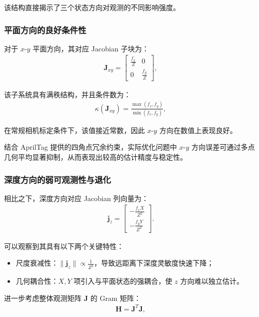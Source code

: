 该结构直接揭示了三个状态方向对观测的不同影响强度。

\subsubsection{平面方向的良好条件性}

对于 $x$-$y$ 平面方向，其对应 Jacobian 子块为：
\begin{align}
\mathbf{J}_{xy} =
\begin{bmatrix}
\frac{f_x}{Z} & 0 \\
0 & \frac{f_y}{Z}
\end{bmatrix},
\end{align}

该子系统具有满秩结构，并且条件数为：
\begin{align}
\kappa(\mathbf{J}_{xy}) = \frac{\max(f_x, f_y)}{\min(f_x, f_y)},
\end{align}

在常规相机标定条件下，该值接近常数，因此 $x$-$y$ 方向在数值上表现良好。

结合 AprilTag 提供的四角点冗余约束，实际优化问题中 $x$-$y$ 方向误差可通过多点几何平均显著抑制，从而表现出较高的估计精度与稳定性。

\subsubsection{深度方向的弱可观测性与退化}

相比之下，深度方向对应 Jacobian 列向量为：
\begin{align}
\mathbf{j}_z =
\begin{bmatrix}
-\frac{f_x X}{Z^2} \\
-\frac{f_y Y}{Z^2}
\end{bmatrix}.
\end{align}

可以观察到其具有以下两个关键特性：

\begin{itemize}
\item 尺度衰减性：$\|\mathbf{j}_z\| \propto \frac{1}{Z^2}$，导致远距离下深度灵敏度快速下降；
\item 几何耦合性：$X,Y$ 项引入与平面状态的强耦合，使 $z$ 方向难以独立估计。
\end{itemize}

进一步考虑整体观测矩阵 $\mathbf{J}$ 的 Gram 矩阵：
\begin{align}
\mathbf{H} = \mathbf{J}^T \mathbf{J},
\end{align}

